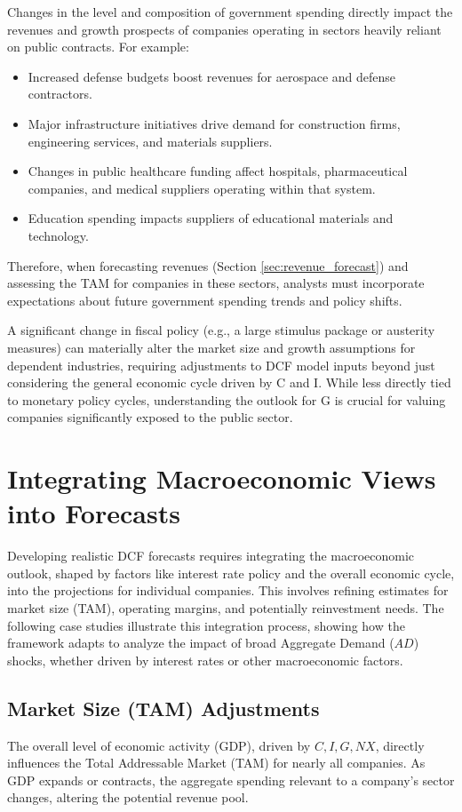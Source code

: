 Changes in the level and composition of government spending directly impact the revenues and growth prospects of companies operating in sectors heavily reliant on public contracts. For example:
\begin{itemize}
    \item Increased defense budgets boost revenues for aerospace and defense contractors.
    \item Major infrastructure initiatives drive demand for construction firms, engineering services, and materials suppliers.
    \item Changes in public healthcare funding affect hospitals, pharmaceutical companies, and medical suppliers operating within that system.
    \item Education spending impacts suppliers of educational materials and technology.
\end{itemize}

Therefore, when forecasting revenues (Section \ref{sec:revenue_forecast}) and assessing the TAM for companies in these sectors, analysts must incorporate expectations about future government spending trends and policy shifts.

A significant change in fiscal policy (e.g., a large stimulus package or austerity measures) can materially alter the market size and growth assumptions for dependent industries, requiring adjustments to DCF model inputs beyond just considering the general economic cycle driven by C and I. While less directly tied to monetary policy cycles, understanding the outlook for G is crucial for valuing companies significantly exposed to the public sector.

\section{Integrating Macroeconomic Views into Forecasts} \label{sec:integrating_macro_views}

Developing realistic DCF forecasts requires integrating the macroeconomic outlook, shaped by factors like interest rate policy and the overall economic cycle, into the projections for individual companies. This involves refining estimates for market size (TAM), operating margins, and potentially reinvestment needs. The following case studies illustrate this integration process, showing how the framework adapts to analyze the impact of broad Aggregate Demand (\(AD\)) shocks, whether driven by interest rates or other macroeconomic factors.

\subsection{Market Size (TAM) Adjustments} \label{subsec:macro_tam}
The overall level of economic activity (GDP), driven by \(C, I, G, NX\), directly influences the Total Addressable Market (TAM) for nearly all companies. As GDP expands or contracts, the aggregate spending relevant to a company's sector changes, altering the potential revenue pool.

